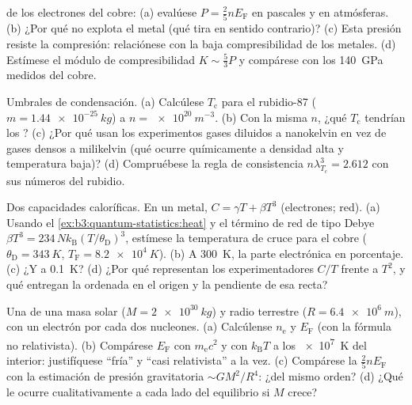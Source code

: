 \begin{exercise}[$\star$]\label{exo:b3:quantum-statistics:3}
 de los electrones del cobre: (a) evalúese $P =
\tfrac25 nE_{\text{F}}$ en pascales y en atmósferas. (b) ¿Por qué no
explota el metal (qué tira en sentido contrario)? (c) Esta presión resiste
la compresión: relaciónese con la baja compresibilidad de los metales. (d) Estímese
el módulo de compresibilidad $K \sim \tfrac53 P$ y compárese con los
\qty{140}{GPa} medidos del cobre.
\end{exercise}

\begin{exercise}[$\star$]\label{exo:b3:quantum-statistics:4}
Umbrales de condensación. (a) Calcúlese $T_{\text{c}}$ para el rubidio-87 ($m =
\qty{1.44e-25}{kg}$) a $n = \qty{e20}{m^{-3}}$. (b) Con la misma
$n$, ¿qué $T_{\text{c}}$ tendrían los ? (c) ¿Por qué usan
los experimentos gases diluidos a nanokelvin en vez de gases
densos a milikelvin (qué ocurre químicamente a densidad alta y
temperatura baja)? (d) Compruébese la regla de consistencia $n\lambda_{T_c}^3
= 2.612$ con sus números del rubidio.
\end{exercise}

\begin{exercise}[$\star\star$]\label{exo:b3:quantum-statistics:5}
Dos capacidades caloríficas. En un metal, $C = \gamma T +
\beta T^3$ (electrones; red). (a) Usando el
\cref{ex:b3:quantum-statistics:heat} y el término de red de tipo Debye
$\beta T^3 = 234\,Nk_{\text{B}}(T/\theta_{\text{D}})^3$,
estímese la temperatura de cruce para el cobre
($\theta_{\text{D}} = \qty{343}{K}$, $T_{\text{F}} =
\qty{8.2e4}{K}$). (b) A \qty{300}{K}, la parte electrónica en
porcentaje. (c) ¿Y a \qty{0.1}{K}? (d) ¿Por qué representan los experimentadores $C/T$
frente a $T^2$, y qué entregan la ordenada en el origen y la pendiente de esa
recta?
\end{exercise}

\begin{exercise}[$\star\star$]\label{exo:b3:quantum-statistics:6}
Una  de una masa solar ($M = \qty{2e30}{kg}$) y radio
terrestre ($R = \qty{6.4e6}{m}$), con un electrón por cada dos nucleones. (a)
Calcúlense $n_{\text{e}}$ y $E_{\text{F}}$ (con la fórmula no
relativista). (b) Compárese $E_{\text{F}}$ con $m_{\text{e}}c^2$ y
con $k_{\text{B}}T$ a los \qty{e7}{K} del interior: justifíquese
``fría'' y ``casi relativista'' a la vez. (c) Compárese
la  $\tfrac25 nE_{\text{F}}$ con la
estimación de presión gravitatoria $\sim GM^2/R^4$: ¿del mismo orden? (d) ¿Qué le ocurre cualitativamente a
cada lado del equilibrio si $M$ crece?
\end{exercise}

